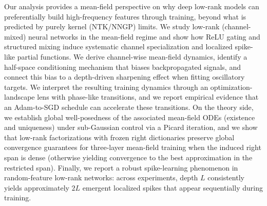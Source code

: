 Our analysis provides a mean-field perspective on why deep low-rank models can preferentially build high-frequency features through training, beyond what is predicted by purely kernel (NTK/NNGP) limits. We study low-rank (channel-mixed) neural networks in the mean-field regime and show how ReLU gating and structured mixing induce systematic channel specialization and localized spike-like partial functions. We derive channel-wise mean-field dynamics, identify a half-space conditioning mechanism that biases backpropagated signals, and connect this bias to a depth-driven sharpening effect when fitting oscillatory targets. We interpret the resulting training dynamics through an optimization-landscape lens with phase-like transitions, and we report empirical evidence that an Adam-to-SGD schedule can accelerate these transitions. On the theory side, we establish global well-posedness of the associated mean-field ODEs (existence and uniqueness) under sub-Gaussian control via a Picard iteration, and we show that low-rank factorizations with frozen right dictionaries preserve global convergence guarantees for three-layer mean-field training when the induced right span is dense (otherwise yielding convergence to the best approximation in the restricted span). Finally, we report a robust spike-learning phenomenon in random-feature low-rank networks: across experiments, depth \(L\) consistently yields approximately \(2L\) emergent localized spikes that appear sequentially during training.